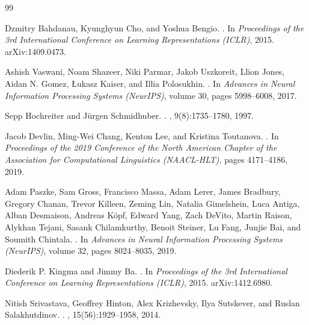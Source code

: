 \documentclass[a4paper]{article}
\begin{document}
\begin{thebibliography}{99}

Dzmitry Bahdanau, Kyunghyun Cho, and Yoshua Bengio.
.
\newblock In {\em Proceedings of the 3rd International Conference on Learning Representations (ICLR)}, 2015.
\newblock arXiv:1409.0473.

Ashish Vaswani, Noam Shazeer, Niki Parmar, Jakob Uszkoreit, Llion Jones, Aidan N. Gomez, {\L}ukasz Kaiser, and Illia Polosukhin.
.
\newblock In {\em Advances in Neural Information Processing Systems (NeurIPS)}, volume 30, pages 5998--6008, 2017.

Sepp Hochreiter and J\"{u}rgen Schmidhuber.
.
, 9(8):1735--1780, 1997.

Jacob Devlin, Ming-Wei Chang, Kenton Lee, and Kristina Toutanova.
.
\newblock In {\em Proceedings of the 2019 Conference of the North American Chapter of the Association for Computational Linguistics (NAACL-HLT)}, pages 4171--4186, 2019.

Adam Paszke, Sam Gross, Francisco Massa, Adam Lerer, James Bradbury, Gregory Chanan, Trevor Killeen, Zeming Lin, Natalia Gimelshein, Luca Antiga, Alban Desmaison, Andreas K\"{o}pf, Edward Yang, Zach DeVito, Martin Raison, Alykhan Tejani, Sasank Chilamkurthy, Benoit Steiner, Lu Fang, Junjie Bai, and Soumith Chintala.
.
\newblock In {\em Advances in Neural Information Processing Systems (NeurIPS)}, volume 32, pages 8024--8035, 2019.

Diederik P. Kingma and Jimmy Ba.
.
\newblock In {\em Proceedings of the 3rd International Conference on Learning Representations (ICLR)}, 2015.
\newblock arXiv:1412.6980.

Nitish Srivastava, Geoffrey Hinton, Alex Krizhevsky, Ilya Sutskever, and Ruslan Salakhutdinov.
.
, 15(56):1929--1958, 2014.


\end{thebibliography}
\end{document}
